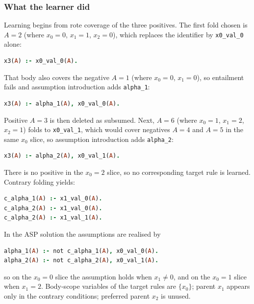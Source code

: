 \documentclass[11pt]{article}
\begin{document}
\subsubsection{What the learner did}

Learning begins from rote coverage of the three positives. The first fold chosen is \(A=2\) (where \(x_0=0\), \(x_1=1\), \(x_2=0\)), which replaces the identifier by \texttt{x0\_val\_0} alone:

\begin{lstlisting}[style=logic,language=Prolog]
x3(A) :- x0_val_0(A).
\end{lstlisting}

That body also covers the negative \(A=1\) (where \(x_0=0\), \(x_1=0\)), so entailment fails and assumption introduction adds \texttt{alpha\_1}:

\begin{lstlisting}[style=logic,language=Prolog]
x3(A) :- alpha_1(A), x0_val_0(A).
\end{lstlisting}

Positive \(A=3\) is then deleted as subsumed. Next, \(A=6\) (where \(x_0=1\), \(x_1=2\), \(x_2=1\)) folds to \texttt{x0\_val\_1}, which would cover negatives \(A=4\) and \(A=5\) in the same \(x_0\) slice, so assumption introduction adds \texttt{alpha\_2}:

\begin{lstlisting}[style=logic,language=Prolog]
x3(A) :- alpha_2(A), x0_val_1(A).
\end{lstlisting}

There is no positive in the \(x_0=2\) slice, so no corresponding target rule is learned. Contrary folding yields:

\begin{lstlisting}[style=logic,language=Prolog]
c_alpha_1(A) :- x1_val_0(A).
c_alpha_2(A) :- x1_val_0(A).
c_alpha_2(A) :- x1_val_1(A).
\end{lstlisting}

In the ASP solution the assumptions are realised by

\begin{lstlisting}[style=logic,language=Prolog]
alpha_1(A) :- not c_alpha_1(A), x0_val_0(A).
alpha_2(A) :- not c_alpha_2(A), x0_val_1(A).
\end{lstlisting}

so on the \(x_0=0\) slice the assumption holds when \(x_1\neq 0\), and on the \(x_0=1\) slice when \(x_1=2\). Body-scope variables of the target rules are \(\{x_0\}\); parent \(x_1\) appears only in the contrary conditions; preferred parent \(x_2\) is unused.
\end{document}
